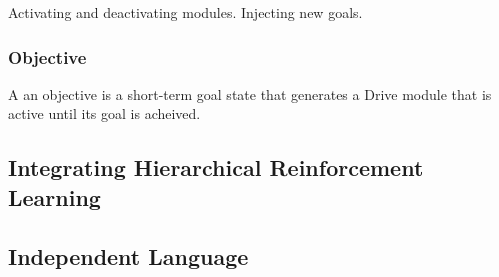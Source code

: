 Activating and deactivating modules. Injecting new goals.

\subsubsection{Objective}

A an objective is a short-term goal state that generates a Drive module
that is active until its goal is acheived.

\subsection{Integrating Hierarchical Reinforcement Learning}

\subsection{Independent Language}
